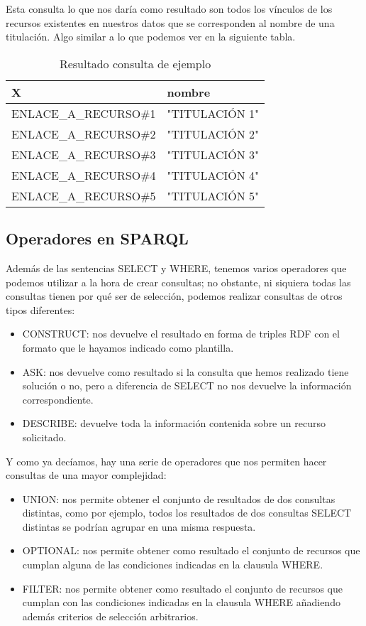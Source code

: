 Esta consulta lo que nos daría como resultado son todos los vínculos de los recursos existentes en nuestros datos que se corresponden al nombre de una titulación. Algo similar a lo que podemos ver en la siguiente tabla.

\begin{table}[!ht]
	\centering
	\begin{tabular}{|p{}|p{}|}
		\hline
		\textbf{X} &
		\textbf{nombre}
		\\ \hline
		ENLACE\_A\_RECURSO\#1&
		"TITULACIÓN 1"
		\\ \hline
		ENLACE\_A\_RECURSO\#2&
		"TITULACIÓN 2"
		\\ \hline
		ENLACE\_A\_RECURSO\#3&
		"TITULACIÓN 3"
		\\ \hline
		ENLACE\_A\_RECURSO\#4&
		"TITULACIÓN 4"
		\\ \hline
		ENLACE\_A\_RECURSO\#5&
		"TITULACIÓN 5"
		\\ \hline
	\end{tabular}
	\caption{Resultado consulta de ejemplo}
	\label{consulta-ejemplo}
\end{table}

\subsection{Operadores en SPARQL}

Además de las sentencias SELECT y WHERE, tenemos varios operadores que podemos utilizar a la hora de crear consultas; no obstante, ni siquiera todas las consultas tienen por qué ser de selección, podemos realizar consultas de otros tipos diferentes:

\begin{itemize}
	\item CONSTRUCT: nos devuelve el resultado en forma de triples RDF con el formato que le hayamos indicado como plantilla.
	\item ASK: nos devuelve como resultado si la consulta que hemos realizado tiene solución o no, pero a diferencia de SELECT no nos devuelve la información correspondiente.
	\item DESCRIBE: devuelve toda la información contenida sobre un recurso solicitado.
\end{itemize}

Y como ya decíamos, hay una serie de operadores que nos permiten hacer consultas de una mayor complejidad:

\begin{itemize}
	\item UNION: nos permite obtener el conjunto de resultados de dos consultas distintas, como por ejemplo, todos los resultados de dos consultas SELECT distintas se podrían agrupar en una misma respuesta.
	\item OPTIONAL: nos permite obtener como resultado el conjunto de recursos que cumplan alguna de las condiciones indicadas en la clausula WHERE.
	\item FILTER: nos permite obtener como resultado el conjunto de recursos que cumplan con las condiciones indicadas en la clausula WHERE añadiendo además criterios de selección arbitrarios.
\end{itemize}


